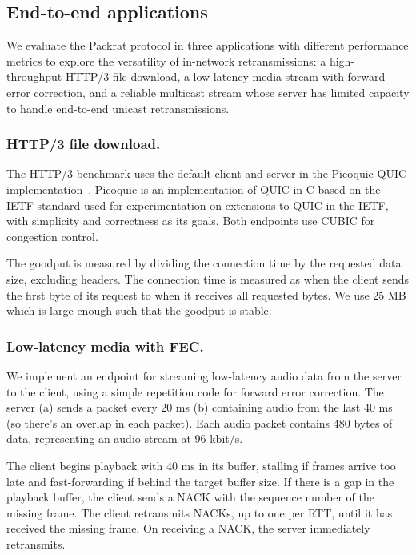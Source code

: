 \subsection{End-to-end applications}
\label{sec:packrat:implementation:applications}

We evaluate the Packrat protocol in three applications with different performance
metrics to explore the versatility of in-network retransmissions:
a high-throughput HTTP/3 file download, a low-latency media stream with forward
error correction, and a reliable multicast stream whose server has limited
capacity to handle end-to-end unicast retransmissions.

\subsubsection{HTTP/3 file download.}

The HTTP/3 benchmark uses the default client and server in the Picoquic QUIC
implementation~\cite{picoquic}. Picoquic is an implementation of QUIC in C
based on the IETF standard used for experimentation on extensions to QUIC in
the IETF, with simplicity and correctness as its goals. Both endpoints use
CUBIC for congestion control.

The goodput is measured by dividing the connection time by the requested data
size, excluding headers.
The connection time is measured as when the client sends the first
byte of its request to when it receives all requested bytes.
We use 25 MB which is large enough such that the goodput is stable.

\subsubsection{Low-latency media with FEC.}

We implement an endpoint for streaming low-latency audio data from the server
to the client, using a simple repetition code for forward error correction.
The server (a) sends a packet every 20 ms
(b) containing audio from the last 40 ms (so there's an overlap in each
packet). Each audio packet contains 480 bytes of data, representing an audio
stream at 96 kbit/s.

The client begins playback with 40 ms in its buffer, stalling if frames arrive
too late and fast-forwarding if behind the target buffer size.
If there is a gap in the
playback buffer, the client sends a NACK with the sequence number of the
missing frame. The client retransmits NACKs, up to one per RTT, until it has
received the missing frame. On receiving a NACK, the server immediately
retransmits.

